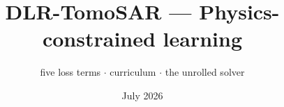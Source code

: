 \documentclass[aspectratio=169,9pt]{beamer}
\title{\textbf{DLR-TomoSAR --- Physics-constrained learning}}
\subtitle{five loss terms \; $\cdot$ \; curriculum \; $\cdot$ \; the unrolled solver}
\date{\small July 2026}
\author{}
\begin{document}
\begin{frame}[plain]
  \titlepage
\end{frame}



\end{document}
